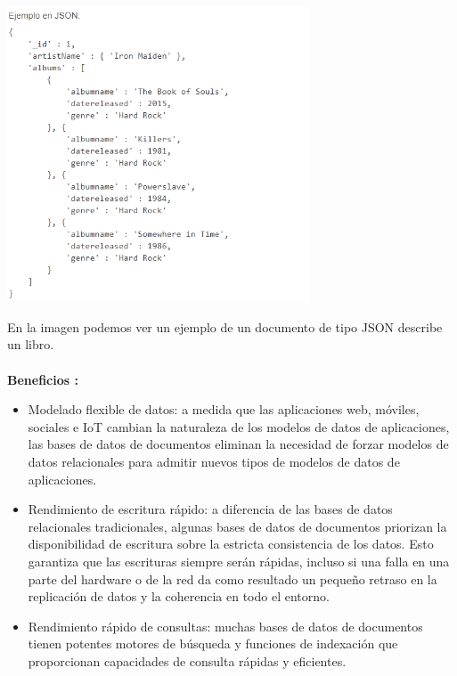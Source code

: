\documentclass[%
 reprint,
 amsmath,amssymb,
 aps,
]{revtex4-1}
\begin{document}
\begin{center}
	\includegraphics[width=9cm]{./Imagenes/documental2}
\end{center}	
En la imagen podemos ver un ejemplo de un documento de tipo JSON describe un libro.\cite{imagen}\\\\
\textbf{Beneficios :}
\begin{itemize}
		\item Modelado flexible de datos: a medida que las aplicaciones web, móviles, sociales e IoT cambian la naturaleza de los modelos de datos de aplicaciones, las bases de datos de documentos eliminan la necesidad de forzar modelos de datos relacionales para admitir nuevos tipos de modelos de datos de aplicaciones.
		\item Rendimiento de escritura rápido: a diferencia de las bases de datos relacionales tradicionales, algunas bases de datos de documentos priorizan la disponibilidad de escritura sobre la estricta consistencia de los datos. Esto garantiza que las escrituras siempre serán rápidas, incluso si una falla en una parte del hardware o de la red da como resultado un pequeño retraso en la replicación de datos y la coherencia en todo el entorno.
		\item Rendimiento rápido de consultas: muchas bases de datos de documentos tienen potentes motores de búsqueda y funciones de indexación que proporcionan capacidades de consulta rápidas y eficientes.
\end{itemize}
\end{document}

